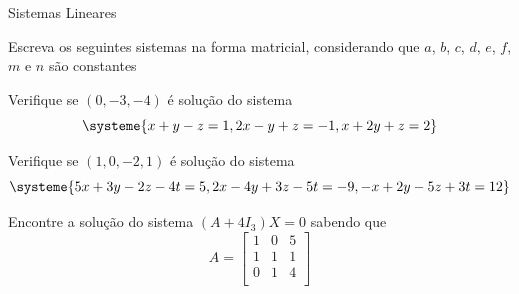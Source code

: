 \begin{exercicios}{Sistemas Lineares}
    \begin{exercicio}
        Escreva os seguintes sistemas na forma matricial, 
        considerando que $a$, $b$, $c$, $d$, $e$, $f$, $m$ e $n$ são constantes
        \begin{mathlist}
            \item {}
            \item {}
            \item {}
            \item {}
            \item {}
            \item {}
        \end{mathlist}
    \end{exercicio}
    
    \begin{exercicio}
        Verifique se $(0,-3,-4)$ é solução do sistema
        \[\systeme{
        	x+y-z      =1,
        	2x-y+z     = -1,
        	x + 2y + z = 2}
        \]
    \end{exercicio}

    \begin{exercicio}
        Verifique se $(1,0,-2,1)$ é solução do sistema
        \[\systeme{
        	5x+3y-2z-4t  =5,
        	2x-4y +3z -5t =-9,
        	-x+2y-5z+3t   =12}
        \]
    \end{exercicio}
        
    \begin{exercicio}
        Encontre a solução do sistema $(A+4I_3)X=0$ sabendo que
        \[ A = \left[ 
        \begin{array}{rrr}
            1 & 0 & 5 \\
            1 & 1 & 1 \\
            0 & 1 & 4 \\
        \end{array}
        \right]\]
    \end{exercicio}
    

\end{exercicios}

